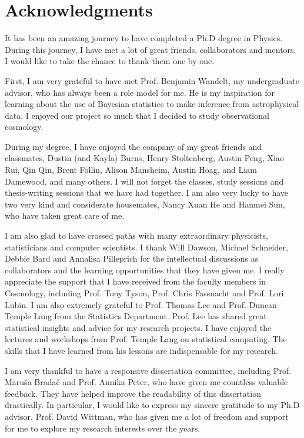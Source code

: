 \section*{Acknowledgments} 

It has been an amazing journey to have completed a Ph.D degree in Physics. 
During this journey, I have met a lot of great friends, collaborators and
mentors. I would like to take the chance to thank them one by one.  

First, I am very grateful to have met Prof. Benjamin Wandelt,  
my undergraduate advisor, who has always been a role model for me. 
He is my inspiration for learning about the use of Bayesian statistics 
to make inference from astrophysical data. I enjoyed our project so much that I   
decided to study observational cosmology.  

During my degree, I have enjoyed the company of my great friends and classmates, Dustin (and Kayla) 
Burns, Henry Stoltenberg, Austin Peng, Xiao Rui, Qin Qin, 
Brent Follin, Alison Mansheim, 
Austin Hoag, and Liam Damewood, and many others. I will not forget the
classes, study sessions and thesis-writing sessions 
that we have had together.
I am also very lucky to have two very kind and considerate housemates, Nancy Xuan He
and Hanmei Sun, who have taken great care of me.  
 
I am also glad to have crossed paths with many 
extraordinary physicists, statisticians and computer scientists. 
I thank Will Dawson, Michael Schneider, Debbie Bard and Annalisa Pilleprich for the intellectual
discussions as collaborators and the learning opportunities that they have
given me. 
I really appreciate the support that I have received from the
faculty members in Cosmology, including Prof. Tony Tyson, 
Prof. Chris Fassnacht and Prof. Lori Lubin. 
I am also extremely grateful to Prof. Thomas Lee and Prof. Duncan Temple Lang from the
Statistics Department. Prof. Lee has shared great statistical insights and 
advice for my research projects. I have enjoyed the lectures and workshops 
from Prof. Temple Lang on statistical computing. The skills that I have learned
from his lessons are indispensable for my research. 
 
I am very thankful to have a responsive dissertation committee, including
Prof. Maru\v{s}a Brada\v{c} and Prof. Annika Peter, who have given me 
countless valuable feedback. They have helped improve the
readability of this dissertation drastically.  
In particular, I would like to express my sincere gratitude to my Ph.D advisor,
Prof. David Wittman, who has given me a lot of freedom and support for 
me to explore my research interests over the years. 

